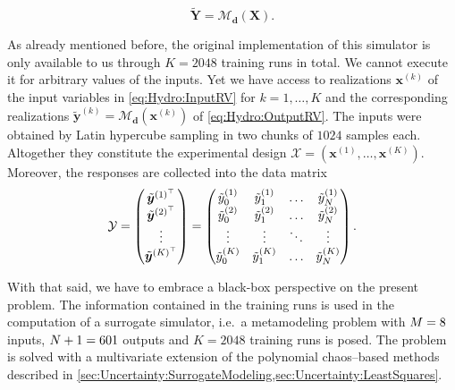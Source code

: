 \begin{equation} \label{eq:Hydro:OutputRV}
  \tilde{\bm{Y}} = \mathcal{M}_{\bm{d}}(\bm{X}).
\end{equation}
\par %
As already mentioned before, the original implementation of this simulator is only available to us through \(K = 2048\) training runs in total.
We cannot execute it for arbitrary values of the inputs.
Yet we have access to realizations \(\bm{x}^{(k)}\) of the input variables in \cref{eq:Hydro:InputRV} for \(k=1,\ldots,K\)
and the corresponding realizations \(\tilde{\bm{y}}^{(k)} = \mathcal{M}_{\bm{d}}(\bm{x}^{(k)})\) of \cref{eq:Hydro:OutputRV}.
The inputs were obtained by Latin hypercube sampling \cite{MCMC:MacKay1979} in two chunks of \(1024\) samples each.
Altogether they constitute the experimental design \(\mathcal{X} = (\bm{x}^{(1)},\ldots,\bm{x}^{(K)})\).
Moreover, the responses are collected into the data matrix
\begin{equation} \label{eq:Hydro:DataMatrix}
  \mathcal{Y} = \begin{pmatrix}
                  \tilde{\bm{y}}^{{(1)}^\top} \\
                  \tilde{\bm{y}}^{{(2)}^\top} \\
                  \vdots \\
                  \tilde{\bm{y}}^{{(K)}^\top} \\
                \end{pmatrix}
              = \begin{pmatrix}
                  \tilde{y}_0^{(1)} & \tilde{y}_1^{(1)} & \ldots & \tilde{y}_N^{(1)} \\
                  \tilde{y}_0^{(2)} & \tilde{y}_1^{(2)} & \ldots & \tilde{y}_N^{(2)} \\
                  \vdots            & \vdots            & \ddots & \vdots \\
                  \tilde{y}_0^{(K)} & \tilde{y}_1^{(K)} & \ldots & \tilde{y}_N^{(K)} \\
                \end{pmatrix}.
\end{equation}
\par %
With that said, we have to embrace a black-box perspective on the present problem.
The information contained in the training runs is used in the computation of a surrogate simulator,
i.e.\ a metamodeling problem with \(M = 8\) inputs, \(N + 1 = 601\) outputs and \(K = 2048\) training runs is posed.
The problem is solved with a multivariate extension of the polynomial chaos--based methods described in \cref{sec:Uncertainty:SurrogateModeling,sec:Uncertainty:LeastSquares}.

